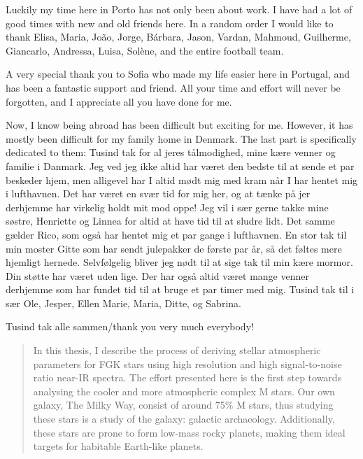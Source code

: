 \documentclass[fleqn]{fcup-thesis}
\begin{document}
\begin{preliminary}
\begin{acknowledgements}
Luckily my time here in Porto has not only been about work. I have had a lot of good times with new
and old friends here. In a random order I would like to thank Elisa, Maria, Jo\~{a}o, Jorge,
B\'{a}rbara, Jason, Vardan, Mahmoud, Guilherme, Giancarlo, Andressa, Luisa, Solène, and the entire
football team.

A very special thank you to Sofia who made my life easier here in Portugal, and has been a fantastic
support and friend. All your time and effort will never be forgotten, and I appreciate all you have
done for me.

Now, I know being abroad has been difficult but exciting for me. However, it has mostly been
difficult for my family home in Denmark. The last part is specifically dedicated to them: Tusind tak
for al jeres tålmodighed, mine kære venner og familie i Danmark. Jeg ved jeg ikke altid har været
den bedste til at sende et par beskeder hjem, men alligevel har I altid mødt mig med kram når I har
hentet mig i lufthavnen. Det har været en svær tid for mig her, og at tænke på jer derhjemme har
virkelig holdt mit mod oppe! Jeg vil i sær gerne takke mine søstre, Henriette og Linnea for altid at
have tid til at sludre lidt. Det samme gælder Rico, som også har hentet mig et par gange i
lufthavnen. En stor tak til min moster Gitte som har sendt julepakker de første par år, så det
føltes mere hjemligt hernede. Selvfølgelig bliver jeg nødt til at sige tak til min kære mormor. Din
støtte har været uden lige. Der har også altid været mange venner derhjemme som har fundet tid til
at bruge et par timer med mig. Tusind tak til i sær Ole, Jesper, Ellen Marie, Maria, Ditte, og
Sabrina.

\vspace{7mm}
Tusind tak alle sammen/thank you very much everybody!


\end{acknowledgements}



\begin{abstract}

In this thesis, I describe the process of deriving stellar atmospheric parameters for FGK stars
using high resolution and high signal-to-noise ratio near-IR spectra. The effort presented here is
the first step towards analysing the cooler and more atmospheric complex M stars. Our own galaxy,
The Milky Way, consist of around 75\% M stars, thus studying these stars is a study of the galaxy:
galactic archaeology. Additionally, these stars are prone to form low-mass rocky planets, making
them ideal targets for habitable Earth-like planets.


\end{abstract}
\end{preliminary}
\end{document}
